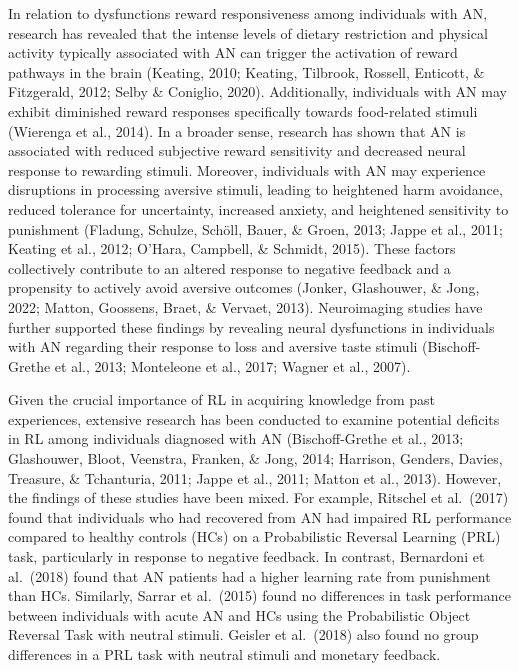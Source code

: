 \documentclass[
  man,floatsintext]{apa6}
\begin{document}
In relation to dysfunctions reward responsiveness among individuals with AN, research has revealed that the intense levels of dietary restriction and physical activity typically associated with AN can trigger the activation of reward pathways in the brain (Keating, 2010; Keating, Tilbrook, Rossell, Enticott, \& Fitzgerald, 2012; Selby \& Coniglio, 2020). Additionally, individuals with AN may exhibit diminished reward responses specifically towards food-related stimuli (Wierenga et al., 2014). In a broader sense, research has shown that AN is associated with reduced subjective reward sensitivity and decreased neural response to rewarding stimuli. Moreover, individuals with AN may experience disruptions in processing aversive stimuli, leading to heightened harm avoidance, reduced tolerance for uncertainty, increased anxiety, and heightened sensitivity to punishment (Fladung, Schulze, Schöll, Bauer, \& Groen, 2013; Jappe et al., 2011; Keating et al., 2012; O'Hara, Campbell, \& Schmidt, 2015). These factors collectively contribute to an altered response to negative feedback and a propensity to actively avoid aversive outcomes (Jonker, Glashouwer, \& Jong, 2022; Matton, Goossens, Braet, \& Vervaet, 2013). Neuroimaging studies have further supported these findings by revealing neural dysfunctions in individuals with AN regarding their response to loss and aversive taste stimuli (Bischoff-Grethe et al., 2013; Monteleone et al., 2017; Wagner et al., 2007).

Given the crucial importance of RL in acquiring knowledge from past experiences, extensive research has been conducted to examine potential deficits in RL among individuals diagnosed with AN (Bischoff-Grethe et al., 2013; Glashouwer, Bloot, Veenstra, Franken, \& Jong, 2014; Harrison, Genders, Davies, Treasure, \& Tchanturia, 2011; Jappe et al., 2011; Matton et al., 2013). However, the findings of these studies have been mixed. For example, Ritschel et al.~(2017) found that individuals who had recovered from AN had impaired RL performance compared to healthy controls (HCs) on a Probabilistic Reversal Learning (PRL) task, particularly in response to negative feedback. In contrast, Bernardoni et al.~(2018) found that AN patients had a higher learning rate from punishment than HCs. Similarly, Sarrar et al.~(2015) found no differences in task performance between individuals with acute AN and HCs using the Probabilistic Object Reversal Task with neutral stimuli. Geisler et al.~(2018) also found no group differences in a PRL task with neutral stimuli and monetary feedback.
\end{document}
